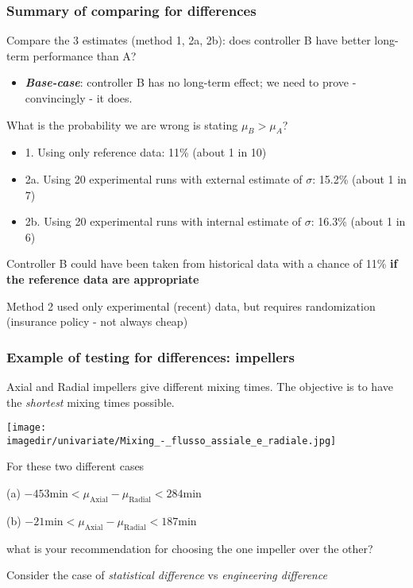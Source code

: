 \begin{frame}\frametitle{Summary of comparing for differences}

	Compare the 3 estimates (method 1, 2a, 2b): does controller B have better long-term performance than A?
	\begin{itemize}
		\item	\textbf{\emph{Base-case}}: controller B has no long-term effect; we need to prove - convincingly - it does.
	\end{itemize}

	What is the probability we are wrong is stating $\mu_B > \mu_A$?
	\begin{itemize}
		\item	1. Using only reference data: 11\% (about 1 in 10)
		\item	2a. Using 20 experimental runs with external estimate of $\sigma$: 15.2\% (about 1 in 7)
		\item	2b. Using 20 experimental runs with internal estimate of $\sigma$: 16.3\% (about 1 in 6)
	\end{itemize}

	Controller B could have been taken from historical data with a chance of 11\% \textbf{if the reference data are appropriate}

	Method 2 used only experimental (recent) data, but requires randomization (insurance policy - not always cheap)
\end{frame}

\begin{frame}\frametitle{Example of testing for differences: impellers}

	Axial and Radial impellers give different mixing times. The objective is to have the \emph{shortest} mixing times possible.
	\begin{center}
		\texttt{[image: \\imagedir/univariate/Mixing\_-\_flusso\_assiale\_e\_radiale.jpg]}
	\end{center}
	\vspace{-6pt}
	For these two different cases

	(a) $-453 \text{min} < \mu_\text{Axial} - \mu_\text{Radial} < 284 \text{min} $

	(b) $-21 \text{min} < \mu_\text{Axial} - \mu_\text{Radial} < 187 \text{min} $

	what is your recommendation for choosing the one impeller over the other?

	Consider the case of \emph{statistical difference} vs \emph{engineering difference}
\end{frame}

